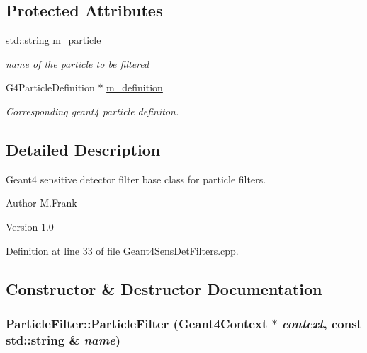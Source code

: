 \subsection*{Protected Attributes}
\begin{DoxyCompactItemize}
\item 
std::string \hyperlink{struct_d_d4hep_1_1_simulation_1_1_particle_filter_a410c1fd6ed11ffb97571fdeac010d882}{m\_\-particle}
\begin{DoxyCompactList}\small\item\em name of the particle to be filtered \item\end{DoxyCompactList}\item 
G4ParticleDefinition $\ast$ \hyperlink{struct_d_d4hep_1_1_simulation_1_1_particle_filter_ae3cc90b48466de4f0a7d38544db44024}{m\_\-definition}
\begin{DoxyCompactList}\small\item\em Corresponding geant4 particle definiton. \item\end{DoxyCompactList}\end{DoxyCompactItemize}


\subsection{Detailed Description}
Geant4 sensitive detector filter base class for particle filters. \begin{DoxyAuthor}{Author}
M.Frank 
\end{DoxyAuthor}
\begin{DoxyVersion}{Version}
1.0 
\end{DoxyVersion}


Definition at line 33 of file Geant4SensDetFilters.cpp.

\subsection{Constructor \& Destructor Documentation}
\hypertarget{struct_d_d4hep_1_1_simulation_1_1_particle_filter_a52c16a1189b557c7c2140e370b747043}{
\subsubsection[{ParticleFilter}]{\setlength{\rightskip}{0pt plus 5cm}ParticleFilter::ParticleFilter ({\bf Geant4Context} $\ast$ {\em context}, \/  const std::string \& {\em name})}}
\label{struct_d_d4hep_1_1_simulation_1_1_particle_filter_a52c16a1189b557c7c2140e370b747043}



